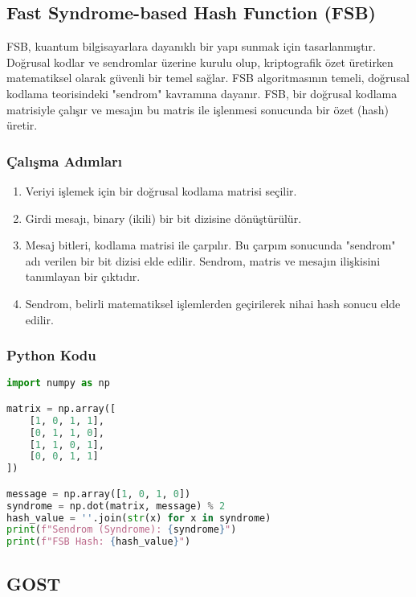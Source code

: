 \newpage

\subsection{Fast Syndrome-based Hash Function (FSB)}

FSB, kuantum bilgisayarlara dayanıklı bir yapı sunmak için tasarlanmıştır. Doğrusal kodlar ve sendromlar üzerine kurulu olup, kriptografik özet üretirken matematiksel olarak güvenli bir temel sağlar. FSB algoritmasının temeli, doğrusal kodlama teorisindeki "sendrom" kavramına dayanır. FSB, bir doğrusal kodlama matrisiyle çalışır ve mesajın bu matris ile işlenmesi sonucunda bir özet (hash) üretir.

\subsubsection{Çalışma Adımları}

\begin{enumerate}
    \item Veriyi işlemek için bir doğrusal kodlama matrisi seçilir.
    \item Girdi mesajı, binary (ikili) bir bit dizisine dönüştürülür. 
    \item Mesaj bitleri, kodlama matrisi ile çarpılır. Bu çarpım sonucunda "sendrom" adı verilen bir bit dizisi elde edilir. Sendrom, matris ve mesajın ilişkisini tanımlayan bir çıktıdır.
    \item Sendrom, belirli matematiksel işlemlerden geçirilerek nihai hash sonucu elde edilir.
\end{enumerate}

\subsubsection{Python Kodu}

\begin{lstlisting}[language=Python]
import numpy as np

matrix = np.array([
    [1, 0, 1, 1],
    [0, 1, 1, 0],
    [1, 1, 0, 1],
    [0, 0, 1, 1]
])

message = np.array([1, 0, 1, 0])
syndrome = np.dot(matrix, message) % 2
hash_value = ''.join(str(x) for x in syndrome)
print(f"Sendrom (Syndrome): {syndrome}")
print(f"FSB Hash: {hash_value}")
\end{lstlisting}

\newpage

\subsection{GOST}

